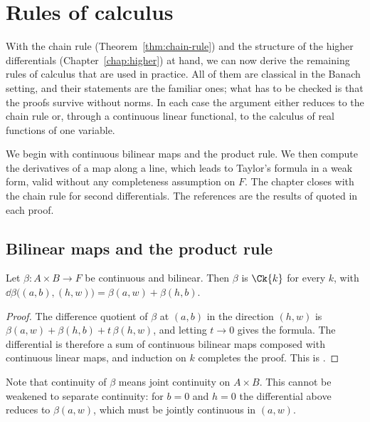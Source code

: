 \chapter{Rules of calculus}
\label{chap:rules}

With the chain rule (Theorem~\ref{thm:chain-rule}) and the structure of the higher
differentials (Chapter~\ref{chap:higher}) at hand, we can now derive the remaining rules of
calculus that are used in practice. All of them are classical in the Banach setting, and their
statements are the familiar ones; what has to be checked is that the proofs survive without
norms. In each case the argument either reduces to the chain rule or, through a continuous
linear functional, to the calculus of real functions of one variable.

We begin with continuous bilinear maps and the product rule. We then compute the derivatives
of a map along a line, which leads to Taylor's formula in a weak form, valid without any
completeness assumption on $F$. The chapter closes with the chain rule for second
differentials. The references are the results of \cite{GN26} quoted in each proof.

\section{Bilinear maps and the product rule}

\begin{theorem}
  \label{thm:bilinear}
  \leanok
  Let $\beta \colon A \times B \to F$ be continuous and bilinear. Then $\beta$ is $\Ck{k}$ for
  every $k$, with $\dd \beta\bigl((a, b), (h, w)\bigr) = \beta(a, w) + \beta(h, b)$.
\end{theorem}

\begin{proof}
  \leanok
  The difference quotient of $\beta$ at $(a,b)$ in the direction $(h,w)$ is
  $\beta(a, w) + \beta(h, b) + t\,\beta(h, w)$, and letting $t \to 0$ gives the formula. The
  differential is therefore a sum of continuous bilinear maps composed with continuous linear
  maps, and induction on $k$ completes the proof. This is \cite[1.2.3 and 1.3.5]{GN26}.
\end{proof}

Note that continuity of $\beta$ means joint continuity on $A \times B$. This cannot be
weakened to separate continuity: for $b = 0$ and $h = 0$ the differential above reduces to
$\beta(a, w)$, which must be jointly continuous in $(a, w)$.

